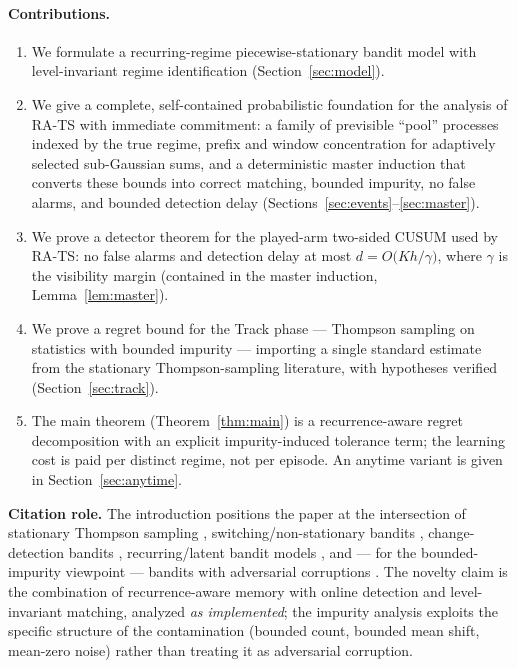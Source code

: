 \documentclass[11pt]{article}
\newcommand{\citationrole}[1]{\par\smallskip\noindent\textcolor{purple!70!black}{\textbf{Citation role.} #1}\par\smallskip}
\begin{document}
\paragraph{Contributions.}
\begin{enumerate}[leftmargin=*]
    \item We formulate a recurring-regime piecewise-stationary bandit model with level-invariant regime identification (Section~\ref{sec:model}).
    \item We give a complete, self-contained probabilistic foundation for the analysis of RA-TS with immediate commitment: a family of previsible ``pool'' processes indexed by the true regime, prefix and window concentration for adaptively selected sub-Gaussian sums, and a deterministic master induction that converts these bounds into correct matching, bounded impurity, no false alarms, and bounded detection delay (Sections~\ref{sec:events}--\ref{sec:master}).
    \item We prove a detector theorem for the played-arm two-sided CUSUM used by RA-TS: no false alarms and detection delay at most $d = O\!\big(K h/\gamma\big)$, where $\gamma$ is the visibility margin (contained in the master induction, Lemma~\ref{lem:master}).
    \item We prove a regret bound for the Track phase --- Thompson sampling on statistics with bounded impurity --- importing a single standard estimate from the stationary Thompson-sampling literature, with hypotheses verified (Section~\ref{sec:track}).
    \item The main theorem (Theorem~\ref{thm:main}) is a recurrence-aware regret decomposition with an explicit impurity-induced tolerance term; the learning cost is paid per distinct regime, not per episode. An anytime variant is given in Section~\ref{sec:anytime}.
\end{enumerate}

\citationrole{The introduction positions the paper at the intersection of stationary Thompson sampling \citep{AgrawalGoyal2013,KaufmannKordaMunos2012,LattimoreSzepesvari2020}, switching/non-stationary bandits \citep{GarivierMoulines2011}, change-detection bandits \citep{LiuLeeShroff2018,BessonKaufmannMaillardSeznec2022}, recurring/latent bandit models \citep{SaberEtAl2021,MaillardMannor2014}, and --- for the bounded-impurity viewpoint --- bandits with adversarial corruptions \citep{LykourisMirrokniPaesLeme2018,GuptaKorenTalwar2019}. The novelty claim is the combination of recurrence-aware memory with online detection and level-invariant matching, analyzed \emph{as implemented}; the impurity analysis exploits the specific structure of the contamination (bounded count, bounded mean shift, mean-zero noise) rather than treating it as adversarial corruption.}
\end{document}
